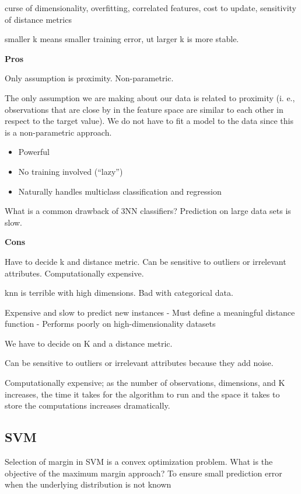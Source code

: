 \documentclass[]{book}
\providecommand{\tightlist}{%
  \setlength{\itemsep}{0pt}\setlength{\parskip}{0pt}}
\begin{document}
curse of dimensionality, overfitting, correlated features, cost to update, sensitivity of distance metrics

smaller k means smaller training error, ut larger k is more stable.

\textbf{Pros}

Only assumption is proximity. Non-parametric.

The only assumption we are making about our data is related to proximity (i.
e., observations that are close by in the feature space are similar to each
other in respect to the target value).
We do not have to fit a model to the data since this is a non-parametric
approach.

\begin{itemize}
\tightlist
\item
  Powerful
\item
  No training involved (``lazy'')
\item
  Naturally handles multiclass classification and regression
\end{itemize}

What is a common drawback of 3NN classifiers? Prediction on large data sets is slow.

\textbf{Cons}

Have to decide k and distance metric. Can be sensitive to outliers or irrelevant attributes. Computationally expensive.

knn is terrible with high dimensions. Bad with categorical data.

Expensive and slow to predict new instances
- Must define a meaningful distance function
- Performs poorly on high-dimensionality datasets

We have to decide on K and a distance metric.

Can be sensitive to outliers or irrelevant attributes because they add noise.

Computationally expensive; as the number of observations, dimensions, and K increases, the time it takes for the algorithm to run and the space it takes to store the computations increases dramatically.

\hypertarget{svm}{%
\subsection{SVM}\label{svm}}

Selection of margin in SVM is a convex optimization problem. What is the objective of the maximum margin approach? To ensure small prediction error when the underlying distribution is not known
\end{document}

